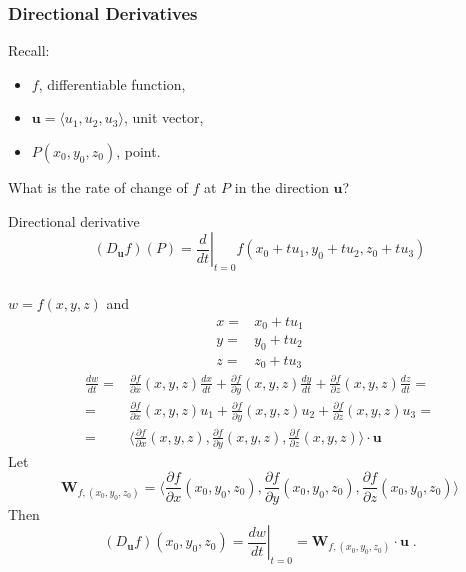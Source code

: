 \begin{frame}
\frametitle{Directional Derivatives}

Recall:
\begin{itemize}
  \item $f$, differentiable function,
  \item $\textbf{u}=\langle u_1,u_2,u_3 \rangle$, unit vector,
  \item $P(x_0,y_0,z_0)$, point.
\end{itemize}
%
What is the rate of change of $f$ at $P$ in the direction $\textbf{u}$?

\pause
Directional derivative
%
$$(D_{\bm{u}}f)(P) = \left. \frac{d}{dt}\right|_{t=0} f(x_0+tu_1, y_0+tu_2,z_0+tu_3)$$  \end{frame}

\begin{frame}
  \frametitle{}
%
$w =f(x,y,z)$ and
%
\begin{align*}
  x = & x_0 + tu_1 \\
  y = & y_0 + tu_2 \\
  z = & z_0 + tu_3
\end{align*}
%
\pause
%
\begin{align*}
  \frac{dw}{dt} = & \frac{\partial f}{\partial x}(x,y,z) \frac{dx}{dt} + \frac{\partial f}{\partial y}(x,y,z) \frac{dy}{dt} + \frac{\partial f}{\partial z}(x,y,z) \frac{dz}{dt} = \\
  = & \frac{\partial f}{\partial x}(x,y,z) u_1 + \frac{\partial f}{\partial y}(x,y,z) u_2 + \frac{\partial f}{\partial z}(x,y,z) u_3 = \\
  = & \langle \frac{\partial f}{\partial x}(x,y,z) , \frac{\partial f}{\partial y}(x,y,z), \frac{\partial f}{\partial z}(x,y,z)\rangle \cdot \textbf{u}
\end{align*}
%
\pause
Let
%
$$\textbf{W}_{f,(x_0,y_0,z_0)} =\langle \frac{\partial f}{\partial x}(x_0,y_0,z_0) , \frac{\partial f}{\partial y}(x_0,y_0,z_0), \frac{\partial f}{\partial z}(x_0,y_0,z_0)\rangle$$
%
\pause
Then
%
$$(D_{\textbf{u}}f)(x_0,y_0,z_0) = \left. \frac{dw}{dt}\right|_{t=0} = \textbf{W}_{f,(x_0,y_0,z_0)} \cdot \textbf{u}\; .$$
\end{frame}